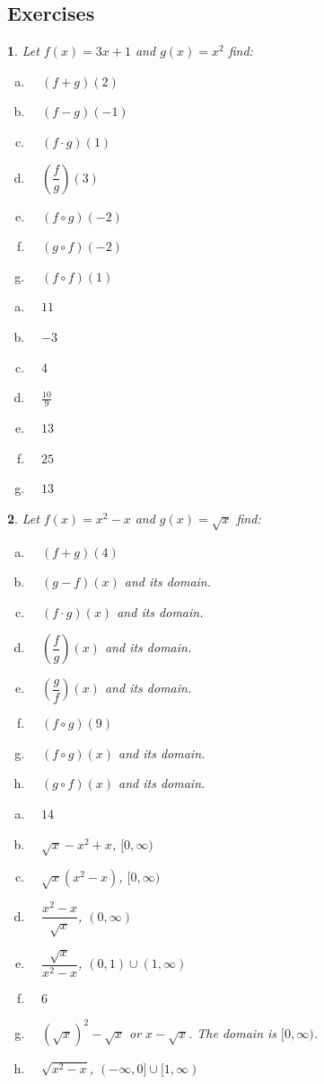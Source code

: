 \documentclass{amsbook}
\newcommand{\ssp}{\begin{enumerate}[(a), leftmargin=*]}
\newcommand{\esp}{\end{enumerate}}
\newtheorem{exc}{}
\newenvironment{ex}{\begin{exc}\normalfont}{\end{exc}}
\numberwithin{section}{chapter}
\numberwithin{equation}{chapter}
\begin{document}
\subsection*{Exercises \nopunct} \hfill
\begin{ex}
	Let $f(x) = 3x+1$ and $g(x) = x^2$ find:
	\begin{multicols}{2}
	\ssp
\item\ \  $(f+g)(2)$
\item\ \  $(f-g)(-1)$
\item\ \  $(f\cdot g)(1)$
\item\ \  $\left( \dfrac{f}{g} \right)(3)$
\item\ \  $(f \circ g)(-2)$
\item\ \  $(g \circ f)(-2)$
\item\ \ $(f \circ f)(1)$
\esp
	\end{multicols}

	\begin{sol}
			\ssp
		\item\ \  $11$
		\item\ \  $-3$
		\item\ \  $4$
		\item\ \  $\frac{10}{9}$
		\item\ \  $13$
		\item\ \  $25$
		\item\ \ $13$
		\esp
	\end{sol}
\end{ex}
\begin{ex}
	Let $f(x) = x^2-x$ and $g(x) = \sqrt{x}$ find:
		\begin{multicols}{2}
	\ssp
	\item\ \  $(f+g)(4)$
	\item\ \  $(g-f)(x)$ and its domain.
	\item\ \  $(f\cdot g)(x)$ and its domain.
	\item\ \  $\left( \dfrac{f}{g} \right)(x)$ and its domain.
	\item\ \  $\left( \dfrac{g}{f} \right)(x)$ and its domain.
	\item\ \  $(f \circ g)(9)$
	\item\ \  $(f \circ g)(x)$ and its domain.
	\item\ \  $(g \circ f)(x)$ and its domain.
	\esp
		\end{multicols}
	\begin{sol}
	\ssp
	\item\ \  $14$
	\item\ \  $\sqrt{x}-x^2+x$, $[0,\infty)$
	\item\ \  $\sqrt{x}(x^2-x)$, $[0,\infty)$
	\item\ \  $\dfrac{x^2-x}{\sqrt{x}}$, $(0,\infty)$
	\item\ \  $\dfrac{\sqrt{x}}{x^2-x}$, $(0,1)\cup(1,\infty)$
	\item\ \  $6$
	\item\ \  $\left( \sqrt{x} \right)^2 - \sqrt{x}$ or $x - \sqrt{x}$. The domain is $[0,\infty)$.
	\item\ \  $\sqrt{x^2-x}$, $(-\infty, 0]\cup [1,\infty)$
\esp
	\end{sol}

\end{ex}
\end{document}
